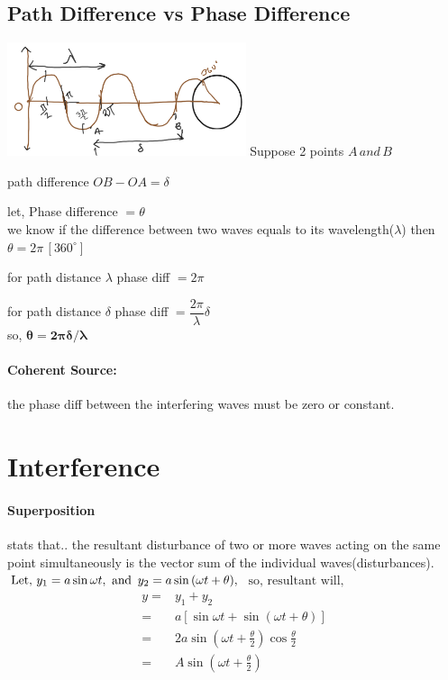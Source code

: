 \documentclass[legalpaper,10pt]{article}
\begin{document}
\begin{multicols*}{2}
	\subsection*{Path Difference vs Phase Difference}
	\includegraphics[width=7cm]{abc.png}
	Suppose 2 points $A\,and\,B$\par
	path difference $OB-OA=\delta$\par
	let, Phase difference $=\theta$\\
	we know if the difference between two waves equals to its wavelength($\lambda$) then $\theta=2\pi\,[360^{\circ}]$\par
	for path distance $\lambda$ phase diff $=2\pi$\par
	for path distance $\delta$ phase diff $=\dfrac{2\pi}{\lambda}\delta$\\
	\indent so, \(\mathbf{\boxed{\theta=2\pi\delta/\lambda }}\)

	\paragraph{Coherent Source:}the phase diff between the interfering waves must be zero or constant.

	\section*{Interference}
	\paragraph{Superposition}stats that.. the resultant disturbance of two or more waves acting on the same point simultaneously is the vector sum of the individual waves(disturbances).\\
	\indent	\( 	\text{Let, }y_1=a\sin{\omega t},  \text{ and } \,y_2=a\sin{(\omega t+\theta)}, \\ \)
	\indent\( 	\text{so, resultant will, } \)
	\begin{align*}
		y= & y_1+y_2
		\\= &a[\sin{\omega t}+\sin{(\omega t+\theta)}]
		\\= &2a \sin{(\omega t+\frac{\theta}{2}) \cos{\frac{\theta}{2}}}
		\\= &A \sin{(\omega t+\frac{\theta}{2})}
	\end{align*}



\end{multicols*}
\end{document}
